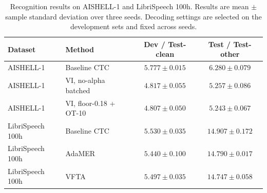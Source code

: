 
\begin{table}[t]
  \centering
  \small
  \caption{Recognition results on AISHELL-1 and LibriSpeech 100h.
  Results are mean $\pm$ sample standard deviation over three seeds.
  Decoding settings are selected on the development sets and fixed across seeds.}
  \label{tab:main_recognition}
  \begin{tabular}{llcc}
    \toprule
    Dataset & Method & Dev / Test-clean & Test / Test-other \\
    \midrule
    AISHELL-1
      & Baseline CTC
      & $5.777 \pm 0.015$
      & $6.280 \pm 0.079$ \\
    AISHELL-1
      & VI, no-alpha batched
      & $4.817 \pm 0.055$
      & $5.257 \pm 0.086$ \\
    AISHELL-1
      & VI, floor-0.18 + OT-10
      & $\mathbf{4.807 \pm 0.050}$
      & $\mathbf{5.243 \pm 0.067}$ \\
    \midrule
    LibriSpeech 100h
      & Baseline CTC
      & $5.530 \pm 0.035$
      & $14.907 \pm 0.172$ \\
    LibriSpeech 100h
      & AdaMER
      & $\mathbf{5.440 \pm 0.100}$
      & $14.790 \pm 0.017$ \\
    LibriSpeech 100h
      & VFTA
      & $5.497 \pm 0.035$
      & $\mathbf{14.747 \pm 0.058}$ \\
    \bottomrule
  \end{tabular}
\end{table}

